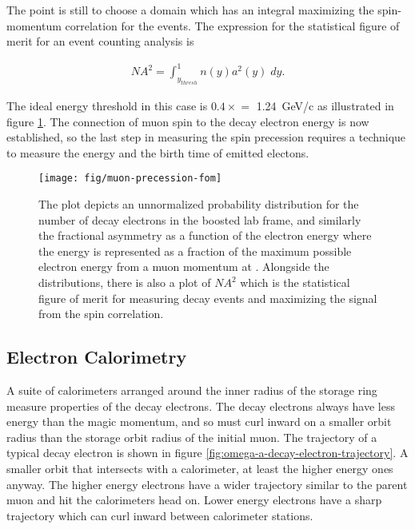 \noindent
The point is still to choose a domain which has an integral maximizing the spin-momentum correlation for the events.  The expression for the statistical figure of merit for an event counting analysis is

\begin{align}
\label{eqn:expt-figure-of-merit}
NA^2 = \int_{y_{thresh}}^{1} n(y) a^2(y) \;dy.
\end{align}

\noindent
The ideal energy threshold in this case is $0.4\times$\pmagic$ = $ \SI{1.24}{\GeV/c} as illustrated in figure \ref{fig:muon-precession-fom}.  The connection of muon spin to the decay electron energy is now established, so the last step in measuring the spin precession requires a technique to measure the energy and the birth time of emitted electons. \cite{e821-prd}

\begin{figure}
\centering
\texttt{[image: fig/muon-precession-fom]}
\caption{The plot depicts an unnormalized probability distribution for the number of decay electrons in the boosted lab frame, and similarly the fractional asymmetry as a function of the electron energy where the energy is represented as a fraction of the maximum possible electron energy from a muon momentum at \pmagic. Alongside the distributions, there is also a plot of $NA^2$ which is the statistical figure of merit for measuring decay events and maximizing the signal from the spin correlation. \label{fig:muon-precession-fom}}
\end{figure}

\subsection{Electron Calorimetry}

A suite of calorimeters arranged around the inner radius of the storage ring measure properties of the decay electrons.  The decay electrons always have less energy than the magic momentum, and so must curl inward on a smaller orbit radius than the storage orbit radius of the initial muon.  The trajectory of a typical decay electron is shown in figure \ref{fig:omega-a-decay-electron-trajectory}.  A smaller orbit that intersects with a calorimeter, at least the higher energy ones anyway. The higher energy electrons have a wider trajectory similar to the parent muon and hit the calorimeters head on.  Lower energy electrons have a sharp trajectory which can curl inward between calorimeter stations.


